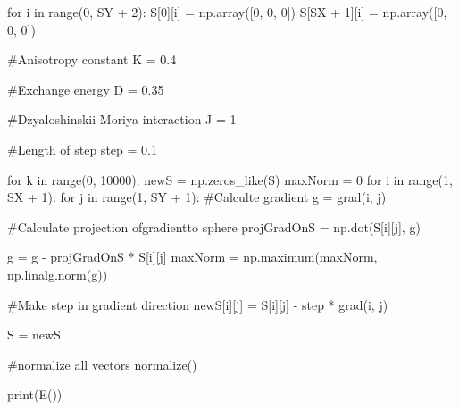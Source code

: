 \documentclass[ 12pt,x11names]{article}
\begin{document}
\begin{python}
    for i in range(0, SY + 2):
        S[0][i] = np.array([0, 0, 0])
        S[SX + 1][i] = np.array([0, 0, 0])

    #Anisotropy constant
    K = 0.4

    #Exchange energy
    D = 0.35

    #Dzyaloshinskii-Moriya interaction
    J = 1

    #Length of step
    step = 0.1


    for k in range(0, 10000):
        newS = np.zeros_like(S)
        maxNorm = 0
        for i in range(1, SX + 1):
            for j in range(1, SY + 1):
                #Calculte gradient
                g = grad(i,  j)

                #Calculate projection ofgradientto sphere
                projGradOnS = np.dot(S[i][j], g)

                g = g - projGradOnS * S[i][j]
                maxNorm = np.maximum(maxNorm, np.linalg.norm(g))

                #Make step in gradient direction
                newS[i][j] = S[i][j] - step * grad(i, j)

        S = newS

        #normalize all vectors
        normalize()

print(E())
\end{python}
\end{document}
